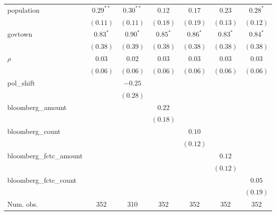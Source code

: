 \begin{table}[!h]
\begin{center}
\begin{tabular}{l c c c c c c }
population              & $0.29^{**}$  & $0.30^{**}$  & $0.12$       & $0.17$       & $0.23$       & $0.28^{*}$   \\
                        & $(0.11)$     & $(0.11)$     & $(0.18)$     & $(0.19)$     & $(0.13)$     & $(0.12)$     \\
govtown                 & $0.83^{*}$   & $0.90^{*}$   & $0.85^{*}$   & $0.86^{*}$   & $0.83^{*}$   & $0.84^{*}$   \\
                        & $(0.38)$     & $(0.39)$     & $(0.38)$     & $(0.38)$     & $(0.38)$     & $(0.38)$     \\
$\rho$                  & $0.03$       & $0.02$       & $0.03$       & $0.03$       & $0.03$       & $0.03$       \\
                        & $(0.06)$     & $(0.06)$     & $(0.06)$     & $(0.06)$     & $(0.06)$     & $(0.06)$     \\
pol\_shift              &              & $-0.25$      &              &              &              &              \\
                        &              & $(0.28)$     &              &              &              &              \\
bloomberg\_amount       &              &              & $0.22$       &              &              &              \\
                        &              &              & $(0.18)$     &              &              &              \\
bloomberg\_count        &              &              &              & $0.10$       &              &              \\
                        &              &              &              & $(0.12)$     &              &              \\
bloomberg\_fctc\_amount &              &              &              &              & $0.12$       &              \\
                        &              &              &              &              & $(0.12)$     &              \\
bloomberg\_fctc\_count  &              &              &              &              &              & $0.05$       \\
                        &              &              &              &              &              & $(0.19)$     \\
\midrule
Num. obs.               & 352          & 310          & 352          & 352          & 352          & 352          \\

\end{tabular}
\end{center}
\end{table}
